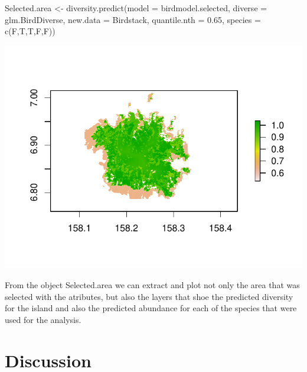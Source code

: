 \documentclass[article]{jss}
\begin{document}
\begin{CodeChunk}
\begin{CodeInput}
Selected.area <- diversity.predict(model = birdmodel.selected, diverse = glm.BirdDiverse, new.data = Birdstack, quantile.nth = 0.65, species =
c(F,T,T,F,F))
\end{CodeInput}


\begin{center}\includegraphics{diversityocc_files/figure-latex/unnamed-chunk-23-1} \end{center}

\end{CodeChunk}

From the object Selected.area we can extract and plot not only the area
that was selected with the atributes, but also the layers that shoe the
predicted diversity for the island and also the predicted abundance for
each of the species that were used for the analysis.

\section{Discussion}\label{discussion}

\renewcommand\refname{References}

\end{document}
